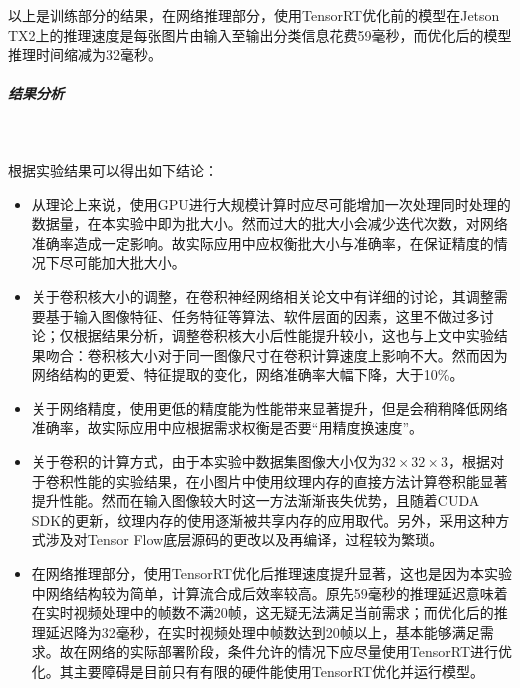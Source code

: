 \par 以上是训练部分的结果，在网络推理部分，使用TensorRT优化前的模型在Jetson TX2上的推理速度是每张图片由输入至输出分类信息花费59毫秒，而优化后的模型推理时间缩减为32毫秒。
\subparagraph{结果分析}~{}
\par 根据实验结果可以得出如下结论：
\begin{itemize}
	\item 从理论上来说，使用GPU进行大规模计算时应尽可能增加一次处理同时处理的数据量，在本实验中即为批大小。然而过大的批大小会减少迭代次数，对网络准确率造成一定影响。故实际应用中应权衡批大小与准确率，在保证精度的情况下尽可能加大批大小。
	\item 关于卷积核大小的调整，在卷积神经网络相关论文中有详细的讨论，其调整需要基于输入图像特征、任务特征等算法、软件层面的因素，这里不做过多讨论；仅根据结果分析，调整卷积核大小后性能提升较小，这也与上文中实验结果吻合：卷积核大小对于同一图像尺寸在卷积计算速度上影响不大。然而因为网络结构的更爱、特征提取的变化，网络准确率大幅下降，大于10\%。
	\item 关于网络精度，使用更低的精度能为性能带来显著提升，但是会稍稍降低网络准确率，故实际应用中应根据需求权衡是否要“用精度换速度”。
	\item 关于卷积的计算方式，由于本实验中数据集图像大小仅为$ 32\times 32\times 3 $，根据对于卷积性能的实验结果，在小图片中使用纹理内存的直接方法计算卷积能显著提升性能。然而在输入图像较大时这一方法渐渐丧失优势，且随着CUDA SDK的更新，纹理内存的使用逐渐被共享内存的应用取代。另外，采用这种方式涉及对Tensor Flow底层源码的更改以及再编译，过程较为繁琐。
	\item 在网络推理部分，使用TensorRT优化后推理速度提升显著，这也是因为本实验中网络结构较为简单，计算流合成后效率较高。原先59毫秒的推理延迟意味着在实时视频处理中的帧数不满20帧，这无疑无法满足当前需求；而优化后的推理延迟降为32毫秒，在实时视频处理中帧数达到20帧以上，基本能够满足需求。故在网络的实际部署阶段，条件允许的情况下应尽量使用TensorRT进行优化。其主要障碍是目前只有有限的硬件能使用TensorRT优化并运行模型。
\end{itemize}
